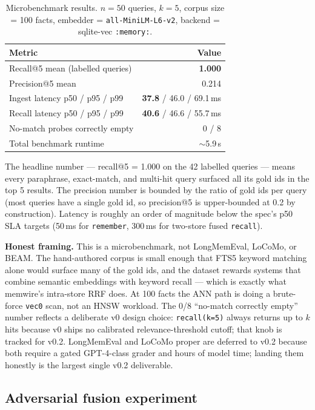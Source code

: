 \documentclass[11pt,letterpaper,twocolumn]{article}
\begin{document}
\begin{table}[t]
\centering
\caption{Microbenchmark results. $n=50$ queries, $k=5$, corpus size = 100 facts, embedder = \texttt{all-MiniLM-L6-v2}, backend = sqlite-vec \texttt{:memory:}.}
\label{tab:microbench}
\small
\begin{tabular}{lr}
\toprule
\textbf{Metric} & \textbf{Value} \\
\midrule
Recall@5 mean (labelled queries) & \textbf{1.000} \\
Precision@5 mean & 0.214 \\
Ingest latency p50 / p95 / p99 & \textbf{37.8} / 46.0 / 69.1\,ms \\
Recall latency p50 / p95 / p99 & \textbf{40.6} / 46.6 / 55.7\,ms \\
No-match probes correctly empty & 0 / 8 \\
Total benchmark runtime & $\sim$5.9\,s \\
\bottomrule
\end{tabular}
\end{table}

The headline number --- recall@5 = 1.000 on the 42 labelled queries --- means every paraphrase, exact-match, and multi-hit query surfaced all its gold ids in the top 5 results. The precision number is bounded by the ratio of gold ids per query (most queries have a single gold id, so precision@5 is upper-bounded at 0.2 by construction). Latency is roughly an order of magnitude below the spec's p50 SLA targets (50\,ms for \texttt{remember}, 300\,ms for two-store fused \texttt{recall}).

\textbf{Honest framing.} This is a microbenchmark, not LongMemEval, LoCoMo, or BEAM. The hand-authored corpus is small enough that FTS5 keyword matching alone would surface many of the gold ids, and the dataset rewards systems that combine semantic embeddings with keyword recall --- which is exactly what memwire's intra-store RRF does. At 100 facts the ANN path is doing a brute-force \texttt{vec0} scan, not an HNSW workload. The 0/8 ``no-match correctly empty'' number reflects a deliberate v0 design choice: \texttt{recall(k=5)} always returns up to $k$ hits because v0 ships no calibrated relevance-threshold cutoff; that knob is tracked for v0.2. LongMemEval and LoCoMo proper are deferred to v0.2 because both require a gated GPT-4-class grader and hours of model time; landing them honestly is the largest single v0.2 deliverable.

\subsection{Adversarial fusion experiment}
\label{sec:eval-adversarial}
\end{document}
